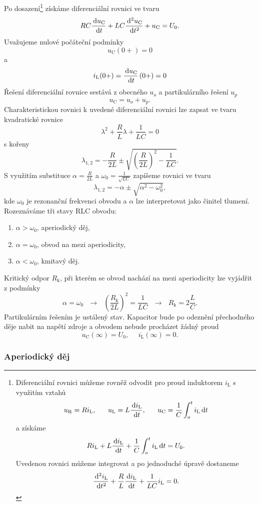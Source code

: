 Po dosazení\footnote{
Diferenciální rovnici můžeme rovněž odvodit pro proud induktorem $i_\mathrm{L}$ s využitím vztahů
$$
u_\mathrm{R} = Ri_\mathrm{L},~~~~~
u_\mathrm{L} = L \frac{\,\mathrm{d} i_\mathrm{L}}{\,\mathrm{d} t} ,~~~~~u_\mathrm{C} = \frac{1}{C} \int_o^t i_\mathrm{L} \,\mathrm{d} t
$$
a získáme
$$
Ri_\mathrm{L} + L \frac{\,\mathrm{d} i_\mathrm{L}}{\,\mathrm{d} t} + \frac{1}{C} \int_o^t i_\mathrm{L} \,\mathrm{d} t = U_0.
$$
Uvedenou rovnici můžeme integrovat a po jednoduché úpravě dostaneme
$$
\frac{\,\mathrm{d}^2 i_\mathrm{L}}{\,\mathrm{d} t^2} + \frac{R}{L} \frac{\,\mathrm{d} i_\mathrm{L}}{\,\mathrm{d} t} + \frac{1}{LC} i_\mathrm{L} = 0.
$$
} získáme diferenciální rovnici ve tvaru
$$
RC \frac{\,\mathrm{d} u_\mathrm{C}}{\,\mathrm{d} t} + LC \frac{\,\mathrm{d}^2 u_\mathrm{C}}{\,\mathrm{d} t^2} + u_\mathrm{C} = U_0.
$$
Uvažujeme nulové počáteční podmínky
$$
u_\mathrm{C}(0+) = 0
$$
a
$$
i_\mathrm{L}(0+) = \frac{\,\mathrm{d} u_\mathrm{C}}{\,\mathrm{d} t} \left( 0+ \right) = 0
$$
Řešení diferenciální rovnice sestává z obecného $u_o$ a partikulárního řešení $u_p$
$$
u_\mathrm{C} = u_o + u_p.
$$
Charakteristickou rovnici k uvedené diferenciální rovnici lze zapsat ve tvaru kvadratické rovnice
$$
\lambda^2 + \frac{R}{L} \lambda + \frac{1}{LC} = 0
$$
s kořeny
$$
\lambda_{1,2} = -\frac{R}{2L} \pm \sqrt{\left( \frac{R}{2L} \right)^2 - \frac{1}{LC}}.
$$
S využitím substituce $\alpha = \frac{R}{2L}$ a $\omega_0 = \frac{1}{\sqrt{LC}}$ zapíšeme rovnici ve tvaru
$$
\lambda_{1,2} = -\alpha \pm \sqrt{\alpha^2 - \omega_0^2},
$$
kde $\omega_0$ je rezonanční frekvenci obvodu a $\alpha$ lze interpretovat jako činitel tlumení. Rozeznáváme tři stavy RLC obvodu:
\begin{enumerate}
\item $\alpha > \omega_0$, aperiodický děj,
\item $\alpha = \omega_0$, obvod na mezi aperiodicity,
\item $\alpha < \omega_0$, kmitavý děj.
\end{enumerate}
Kritický odpor $R_\mathrm{k}$, při kterém se obvod nachází na mezi aperiodicity lze vyjádřit z podmínky
$$
\alpha = \omega_0~~~ \rightarrow ~~~\left( \frac{R_\mathrm{k}}{2L} \right)^2 = \frac{1}{LC}~~~ \rightarrow ~~~R_\mathrm{k} = 2 \frac{L}{C}.
$$
Partikulárním řešením je ustálený stav. Kapacitor bude po odeznění přechodného děje nabit na napětí zdroje a obvodem nebude procházet žádný proud 
$$
u_\mathrm{C}(\infty) = U_0,~~~~~~
i_\mathrm{L}(\infty) = 0.
$$

\subsubsection{Aperiodický děj}

